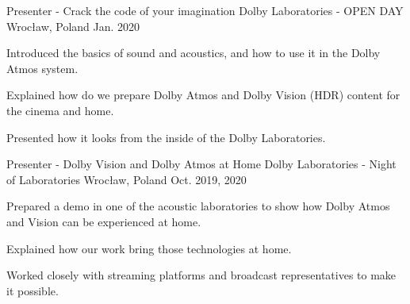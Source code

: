 

\begin{cventries}

  \cventry
    {Presenter - Crack the code of your imagination} %
    {Dolby Laboratories - OPEN DAY} %
    {Wrocław, Poland} %
    {Jan. 2020} %
    {
      \begin{cvitems} %
        \item {Introduced the basics of sound and acoustics, and how to use it in the Dolby Atmos system.}
        \item {Explained how do we prepare Dolby Atmos and Dolby Vision (HDR) content for the cinema and home.}
        \item {Presented how it looks from the inside of the Dolby Laboratories.}
      \end{cvitems}
    }

  \cventry
    {Presenter - Dolby Vision and Dolby Atmos at Home} %
    {Dolby Laboratories - Night of Laboratories} %
    {Wrocław, Poland} %
    {Oct. 2019, 2020} %
    {
      \begin{cvitems} %
        \item {Prepared a demo in one of the acoustic laboratories to show how Dolby Atmos and Vision can be experienced at home.}
        \item {Explained how our work bring those technologies at home.}
        \item {Worked closely with streaming platforms and broadcast representatives to make it possible.}
      \end{cvitems}
    }

\end{cventries}

